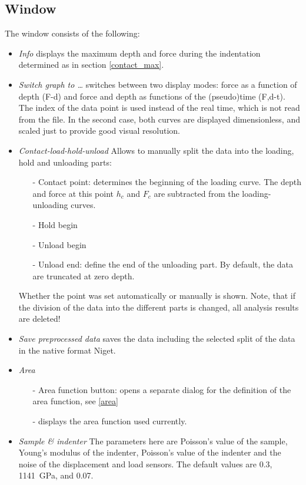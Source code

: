 \subsection{Window}
The window consists of the following:
\begin{itemize}
 \item \emph{Info} displays the maximum depth and force during the indentation determined as in section \ref{contact_max}. 
 \item \emph{Switch graph to \dots} switches between two display modes: force as a function of depth (F-d) and force and depth as functions of the (pseudo)time (F,d-t). The index of the data point is used instead of the real time, which is not read from the file.
 In the second case, both curves are displayed dimensionless, and scaled just to provide good visual resolution.
 \item \emph{Contact-load-hold-unload} Allows to manually split the data into the loading, hold and unloading parts:
 \begin{itemize}
 \item[-] Contact point: determines the beginning of the loading curve. The depth and force at this point $h_c$ and $F_c$ are subtracted from the loading-unloading curves.
 \item[-] Hold begin
 \item[-] Unload begin 
 \item[-] Unload end: define the end of the unloading part. By default, the data are truncated at zero depth.
\end{itemize}
  Whether the point was set automatically or manually is shown. Note, that if the division of the data into the different parts is changed, all analysis results are deleted!
 \item \emph{Save preprocessed data} saves the data including the selected split of the data in the native format Niget. 
 \item \emph{Area}
 \begin{itemize}
 \item[-] Area function button: opens a separate dialog for the definition of the area function, see \ref{area}
 \item[-] displays the area function used currently.
 \end{itemize}
  \item \emph{Sample \& indenter}
    The parameters here are Poisson's value of the sample, Young's modulus of the indenter, Poisson's value of the indenter and the noise of the displacement and load sensors. The default values are 0.3, 1141~GPa, and 0.07. 

\end{itemize}
